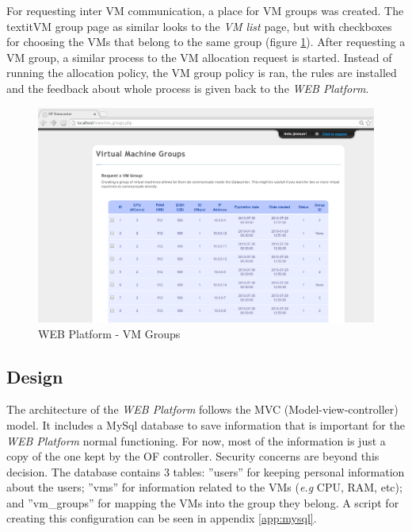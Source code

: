 \documentclass[12pt,english,oneside]{book}
\begin{document}
For requesting inter VM communication, a place for VM groups was created. The textit{VM group} page as similar looks to the \textit{VM list} page, but with checkboxes for choosing the VMs that belong to the same group (figure \ref{fig:webplatvmgroup}).
After requesting a VM group, a similar process to the VM allocation request is started. Instead of running the allocation policy, the VM group policy is ran, the rules are installed and the feedback about whole process is given back to the \textit{WEB Platform}.

\begin{figure}[h!tbp]
        \centering
        \includegraphics[width=1\textwidth]{figures/webplat_vmgroup.png}
        \caption{WEB Platform - VM Groups}
        \label{fig:webplatvmgroup}
\end{figure}

\subsection{Design}
\hspace{0.6cm}

The architecture of the \textit{WEB Platform} follows the MVC (Model-view-controller) model.
It includes a MySql\cite{mysql} database to save information that is important for the \textit{WEB Platform} normal functioning. For now, most of the information is just a copy of the one kept by the OF controller. Security concerns are beyond this decision.
The database contains $3$ tables: ''users'' for keeping personal information about the users; ''vms'' for information related to the VMs (\textit{e.g} CPU, RAM, etc); and ''vm\_groups'' for mapping the VMs into the group they belong.
A script for creating this configuration can be seen in appendix \ref{app:mysql}.
\end{document}
